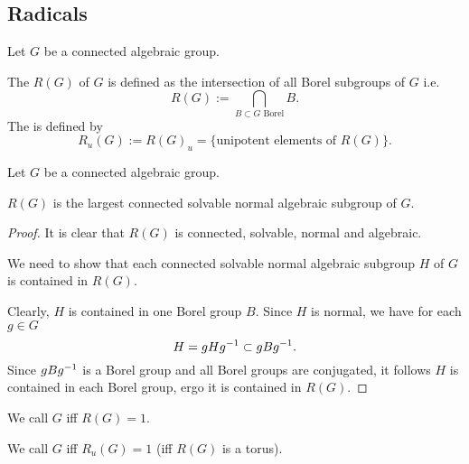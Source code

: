 \subsection{Radicals}
Let $G$ be a connected algebraic group.

\begin{definition}
	The  $R(G)$ of $G$ is defined as the intersection of all Borel subgroups of $G$ i.e.
	\[ R(G) := \bigcap_{B \subset G \text{ Borel}} B. \]
	The  is defined by
	\[ R_u(G) := R(G)_u = \{ \text{unipotent elements of } R(G)\}. \]
\end{definition}

\begin{lemma}
	Let $G$ be a connected algebraic group.
	
	$R(G)$ is the largest connected solvable normal algebraic subgroup of $G$.
\end{lemma}
\begin{proof}
	It is clear that $R(G)$ is connected, solvable, normal and algebraic.
	
	We need to show that each connected solvable normal algebraic subgroup $H$ of $G$ is contained in $R(G)$.
	
	Clearly, $H$ is contained in one Borel group $B$. Since $H$ is normal, we have for each $g \in G$
	\[ H = gHg^{-1} \subset gBg^{-1}. \]
	Since $gBg^{-1}$ is a Borel group and all Borel groups are conjugated, it follows $H$ is contained in each Borel group, ergo it is contained in $R(G)$.
\end{proof}

\begin{definition}
	We call $G$  iff $R(G) = 1$.
	
	We call $G$  iff $R_u(G) = 1$ (iff $R(G)$ is a torus).
\end{definition}

